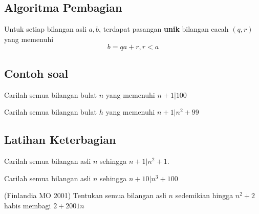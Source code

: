 \documentclass[11pt]{scrartcl}
\begin{document}
\subsection{Algoritma Pembagian}
Untuk setiap bilangan asli $a,b$, terdapat pasangan \textbf{unik} bilangan cacah $(q,r)$ yang memenuhi $$b = qa + r,  r<a$$ 

\subsection{Contoh soal}
\begin{problem}
    Carilah semua bilangan bulat $n$ yang memenuhi $n + 1 | 100$
\end{problem}

\begin{problem}
    Carilah semua bilangan bulat $h$ yang memenuhi $n + 1 | n^2 + 99$
\end{problem}

\subsection{Latihan Keterbagian}
\begin{problem}
    Carilah semua bilangan asli $n$ sehingga $n + 1| n^2 + 1$.
\end{problem}

\begin{problem}
    Carilah semua bilangan asli $n$ sehingga $n + 10| n^3 + 100$
\end{problem}

\begin{problem}
    (Finlandia MO 2001) Tentukan semua bilangan asli $n$ sedemikian hingga $n^2 + 2$ habis membagi $2 + 2001n$
\end{problem}
\end{document}
